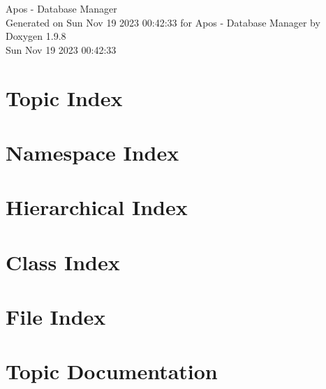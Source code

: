 \documentclass[twoside]{book}
\newcommand{\+}{\discretionary{\mbox{\scriptsize$\hookleftarrow$}}{}{}}
\newcommand{\clearemptydoublepage}{%
    \newpage{\pagestyle{empty}\cleardoublepage}%
  }
\begin{document}
  \raggedbottom
    \hypersetup{pageanchor=false,
                bookmarksnumbered=true,
                pdfencoding=unicode
               }
  \begin{titlepage}
  \vspace*{7cm}
  \begin{center}%
  {\Large Apos -\/ Database Manager}\\
  \vspace*{1cm}
  {\large Generated on Sun Nov 19 2023 00\+:42\+:33 for Apos -\/ Database Manager by Doxygen 1.9.8}\\
    \vspace*{0.5cm}
    {\small Sun Nov 19 2023 00:42:33}
  \end{center}
  \end{titlepage}
  \clearemptydoublepage
  \tableofcontents
  \clearemptydoublepage
  \hypersetup{pageanchor=true}


\chapter{Topic Index}

\chapter{Namespace Index}

\chapter{Hierarchical Index}

\chapter{Class Index}

\chapter{File Index}

\chapter{Topic Documentation}









\end{document}
